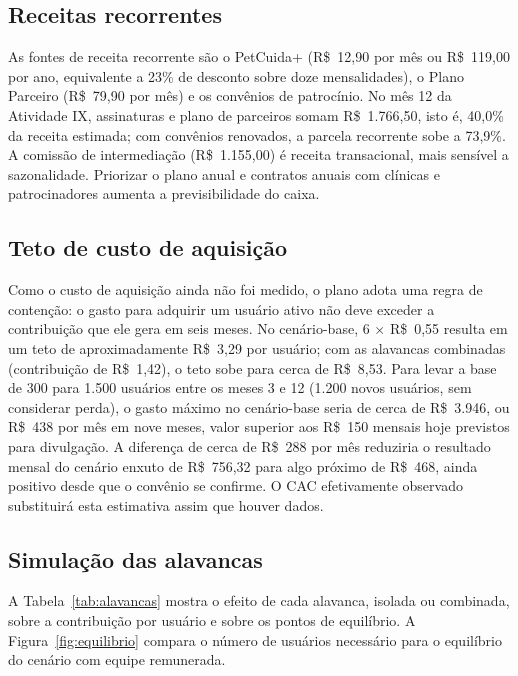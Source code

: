 \subsection{Receitas recorrentes}

As fontes de receita recorrente são o PetCuida+ (R\$~12,90 por mês ou R\$~119,00 por ano, equivalente a 23\% de desconto sobre doze mensalidades), o Plano Parceiro (R\$~79,90 por mês) e os convênios de patrocínio. No mês 12 da Atividade IX, assinaturas e plano de parceiros somam R\$~1.766,50, isto é, 40,0\% da receita estimada; com convênios renovados, a parcela recorrente sobe a 73,9\%. A comissão de intermediação (R\$~1.155,00) é receita transacional, mais sensível a sazonalidade. Priorizar o plano anual e contratos anuais com clínicas e patrocinadores aumenta a previsibilidade do caixa.

\subsection{Teto de custo de aquisição}
\label{sub:cac}

Como o custo de aquisição ainda não foi medido, o plano adota uma regra de contenção: o gasto para adquirir um usuário ativo não deve exceder a contribuição que ele gera em seis meses. No cenário-base, 6 $\times$ R\$~0,55 resulta em um teto de aproximadamente R\$~3,29 por usuário; com as alavancas combinadas (contribuição de R\$~1,42), o teto sobe para cerca de R\$~8,53. Para levar a base de 300 para 1.500 usuários entre os meses 3 e 12 (1.200 novos usuários, sem considerar perda), o gasto máximo no cenário-base seria de cerca de R\$~3.946, ou R\$~438 por mês em nove meses, valor superior aos R\$~150 mensais hoje previstos para divulgação. A diferença de cerca de R\$~288 por mês reduziria o resultado mensal do cenário enxuto de R\$~756,32 para algo próximo de R\$~468, ainda positivo desde que o convênio se confirme. O CAC efetivamente observado substituirá esta estimativa assim que houver dados.

\subsection{Simulação das alavancas}

A Tabela~\ref{tab:alavancas} mostra o efeito de cada alavanca, isolada ou combinada, sobre a contribuição por usuário e sobre os pontos de equilíbrio. A Figura~\ref{fig:equilibrio} compara o número de usuários necessário para o equilíbrio do cenário com equipe remunerada.

